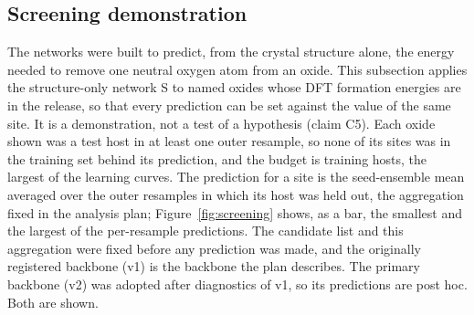 \subsection{Screening demonstration}
\label{sec:screening}

The networks were built to predict, from the crystal structure alone, the energy needed to remove one neutral oxygen atom from an oxide. This subsection applies the structure-only network S to named oxides whose DFT formation energies are in the release, so that every prediction can be set against the value of the same site. It is a demonstration, not a test of a hypothesis (claim C5). Each oxide shown was a test host in at least one outer resample, so none of its sites was in the training set behind its prediction, and the budget is \numScreeningDemoBudget{} training hosts, the largest of the learning curves. The prediction for a site is the seed-ensemble mean averaged over the outer resamples in which its host was held out, the aggregation fixed in the analysis plan; Figure~\ref{fig:screening} shows, as a bar, the smallest and the largest of the per-resample predictions. The candidate list and this aggregation were fixed before any prediction was made, and the originally registered backbone (v1) is the backbone the plan describes. The primary backbone (v2) was adopted after diagnostics of v1, so its predictions are post hoc. Both are shown.

